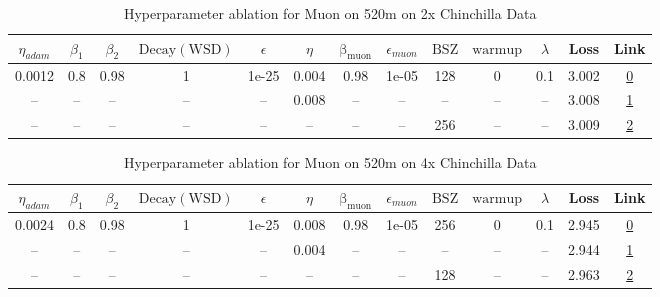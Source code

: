 \begin{table}[H]
\centering
\caption{Hyperparameter ablation for Muon on 520m on 2x Chinchilla Data}
\label{tab:ablation_muon_520m_2}
\begin{tabular}{ccccccccccccc}
\toprule
$\eta_{adam}$ & $\beta_1$ & $\beta_2$ & $\mathrm{Decay (WSD)}$ & $\epsilon$ & $\eta$ & $\mathrm{\beta_{muon}}$ & $\epsilon_{muon}$ & $\mathrm{BSZ}$ & $\mathrm{warmup}$ & $\lambda$ & Loss & Link \\
\midrule
0.0012 & 0.8 & 0.98 & 1 & 1e-25 & 0.004 & 0.98 & 1e-05 & 128 & 0 & 0.1 & 3.002 & \href{https://wandb.ai/stanford-mercury/optimizer-scaling/runs/sweep-520m-21B-muon7ace6clr0.004-wd0.1-minlr0-warmup0-b10.8-b20.-748517}{0} \\
\midrule
-- & -- & -- & -- & -- & 0.008 & -- & -- & -- & -- & -- & 3.008 & \href{https://wandb.ai/stanford-mercury/optimizer-scaling/runs/sweep-520m-21B-muon92eab1lr0.008-wd0.1-minlr0-warmup0-b10.8-b20.-02816a}{1} \\
-- & -- & -- & -- & -- & -- & -- & -- & 256 & -- & -- & 3.009 & \href{https://wandb.ai/stanford-mercury/optimizer-scaling/runs/sweep-520m-21B-muonfcc2a8lr0.004-wd0.1-minlr0-warmup0-b10.8-b20.-f61e26}{2} \\
\bottomrule
\end{tabular}
\end{table}

\begin{table}[H]
\centering
\caption{Hyperparameter ablation for Muon on 520m on 4x Chinchilla Data}
\label{tab:ablation_muon_520m_4}
\begin{tabular}{ccccccccccccc}
\toprule
$\eta_{adam}$ & $\beta_1$ & $\beta_2$ & $\mathrm{Decay (WSD)}$ & $\epsilon$ & $\eta$ & $\mathrm{\beta_{muon}}$ & $\epsilon_{muon}$ & $\mathrm{BSZ}$ & $\mathrm{warmup}$ & $\lambda$ & Loss & Link \\
\midrule
0.0024 & 0.8 & 0.98 & 1 & 1e-25 & 0.008 & 0.98 & 1e-05 & 256 & 0 & 0.1 & 2.945 & \href{https://wandb.ai/stanford-mercury/optimizer-scaling/runs/sweep-520m-42B-muon92eab1lr0.008-wd0.1-minlr0-warmup0-b10.8-b20.-f2fd04}{0} \\
\midrule
-- & -- & -- & -- & -- & 0.004 & -- & -- & -- & -- & -- & 2.944 & \href{https://wandb.ai/stanford-mercury/optimizer-scaling/runs/sweep-520m-42B-muonrde8a35lr0.004-wd0.1-minlr0-warmup0-b10.8-b20-0393ec}{1} \\
-- & -- & -- & -- & -- & -- & -- & -- & 128 & -- & -- & 2.963 & \href{https://wandb.ai/stanford-mercury/optimizer-scaling/runs/sweep-520m-42B-muonc58c06lr0.008-wd0.1-minlr0-warmup0-b10.8-b20.-dfd7f2}{2} \\
\bottomrule
\end{tabular}
\end{table}

